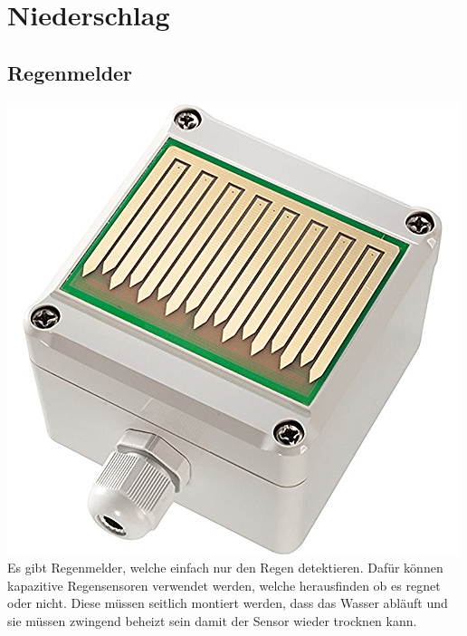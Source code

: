 \section{Niederschlag}

\subsection{Regenmelder}
\begin{multicols}{2}
{ \centering
\includegraphics[width=0.4\columnwidth]{graphics/regenmelder.jpg}\\
\label{regenmelder}
}
\columnbreak
Es gibt Regenmelder, welche einfach nur den Regen detektieren. Dafür können kapazitive Regensensoren verwendet werden, welche herausfinden ob es regnet oder nicht. Diese müssen seitlich montiert werden, dass das Wasser abläuft und sie müssen zwingend beheizt sein damit der Sensor wieder trocknen kann. \cite[S.51]{Hesse2014} 
\end{multicols}

